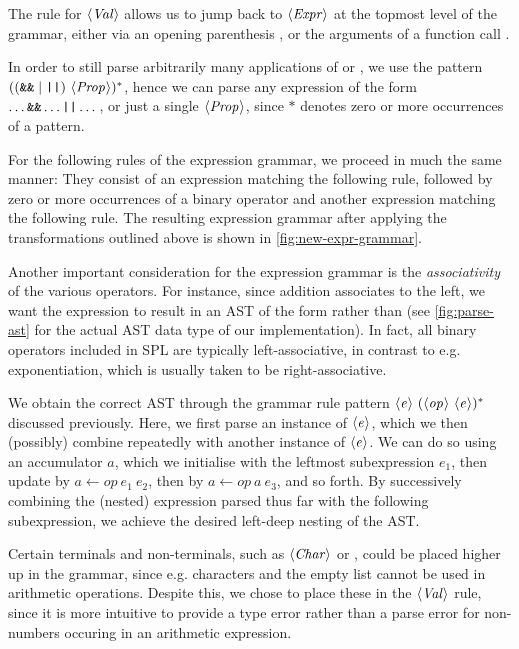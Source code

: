The rule for $\langle \textit{Val}\kern.7pt \rangle$ allows us to jump back to $\langle \textit{Expr}\kern.7pt \rangle$ at the topmost
level of the grammar, either via an opening parenthesis \spl{(}, or the
arguments of a function call .

In order to still parse arbitrarily many applications of \code{\&\&} or
\code{||}, we use the pattern $((\texttt{\&\&} \mid \texttt{||})\ \langle \textit{Prop}\kern.7pt \rangle)^*$,
hence we can parse any expression of the form $\dots \texttt{\&\&} \dots \texttt{||} \dots$,
or just a single $\langle \textit{Prop}\kern.7pt \rangle$, since $*$ denotes zero or more occurrences of
a pattern.

For the following rules of the expression grammar, we proceed in much the same
manner: They consist of an expression matching the following rule, followed
by zero or more occurrences of a binary operator and another expression matching
the following rule. The resulting expression grammar after applying the
transformations outlined above is shown in \cref{fig:new-expr-grammar}.


Another important consideration for the expression grammar is the
\emph{associativity} of the various operators. For instance, since addition
associates to the left, we want the expression  to result in an AST
of the form  rather than  (see
\cref{fig:parse-ast} for the actual AST data type of our implementation).
In fact, all binary operators included in SPL are typically left-associative, in
contrast to e.g. exponentiation, which is usually taken to be right-associative.

We obtain the correct AST through the grammar rule pattern
$\langle \textit{e}\kern.7pt \rangle\ (\langle \textit{op}\kern.7pt \rangle\ \langle \textit{e}\kern.7pt \rangle)^*$ discussed previously.
Here, we first parse an instance of $\langle \textit{e}\kern.7pt \rangle$, which we then (possibly) combine
repeatedly with another instance of $\langle \textit{e}\kern.7pt \rangle$. We can do so using an
accumulator $a$, which we initialise with the leftmost subexpression
$e_1$, then update by $a \leftarrow op\ e_1\ e_2$, then by
$a \leftarrow op\ a\ e_3$, and so forth. By successively combining the (nested)
expression parsed thus far with the following subexpression, we achieve the
desired left-deep nesting of the AST.

Certain terminals and non-terminals, such as $\langle \textit{Char}\kern.7pt \rangle$ or \code{[]}, could be
placed higher up in the grammar, since e.g. characters and the empty list cannot
be used in arithmetic operations. Despite this, we chose to place these in the
$\langle \textit{Val}\kern.7pt \rangle$ rule, since it is more intuitive to provide a type error rather than
a parse error for non-numbers occuring in an arithmetic expression.


